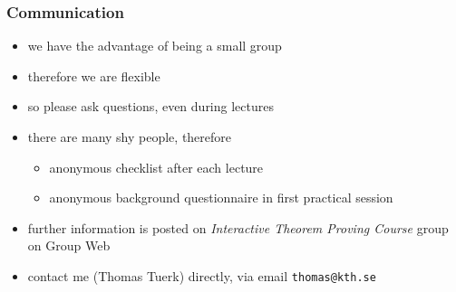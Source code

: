 \begin{frame}
\frametitle{Communication}
\begin{itemize}
\item we have the advantage of being a small group
\item therefore we are flexible
\item so please ask questions, even during lectures
\item there are many shy people, therefore
\begin{itemize}
\item anonymous checklist after each lecture
\item anonymous background questionnaire in first practical session
\end{itemize}
\item further information is posted on \emph{Interactive Theorem Proving Course} group on Group Web
\item contact me (Thomas Tuerk) directly, \eg via email \texttt{thomas@kth.se}
\end{itemize}
\end{frame}


